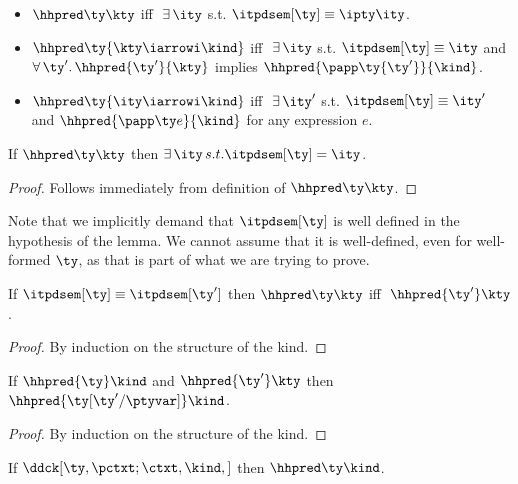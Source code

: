 \begin{definition}
\label{def:pd-props}
\begin{itemize}
\item $\hhpred \ty \kty$ iff $\ \exists\,\ity$ s.t. $\itpdsem[\ty] \equiv
  {\ipty \ity}$.
\item $\hhpred \ty {\kty \iarrowi \kind}$ iff $\ \exists\,\ity$
  s.t. $\itpdsem[\ty] \equiv \ity$ and $\forall\,\ty'.\,\hhpred
  {\ty'}{\kty}$ implies $\hhpred {\papp \ty {\ty'}}{\kind}$.
\item $\hhpred \ty {\ity \iarrowi \kind}$ iff $\ \exists\,\ity'$
  s.t. $\itpdsem[\ty] \equiv \ity'$ and $\hhpred{\papp \ty e}{\kind}$
  for any expression $e$.
\end{itemize}
\end{definition}

\begin{lemma}
  If $\hhpred \ty \kty$ then $\exists \, \ity \, s.t. \itpdsem[\ty] =
  \ity$.
\label{lemma:H-prop}
\end{lemma}
\begin{proof}
  Follows immediately from definition of $\hhpred \ty \kty$.
\end{proof}

Note that we implicitly demand that $\itpdsem[\ty]$ is well defined in
the hypothesis of the lemma. We cannot assume that it is well-defined,
even for well-formed $\ty$, as that is part of what we are trying to
prove.

\begin{lemma}
  If $\itpdsem[\ty] \equiv \itpdsem[\ty']$ then $\hhpred \ty \kty$ iff $\;\hhpred {\ty'} \kty$.
\label{lemma:eq-preserve-H}
\end{lemma}
\begin{proof}
  By induction on the structure of the kind.
\end{proof}

\begin{lemma}
  If $\hhpred {\ty} \kind$ and $\hhpred {\ty'} \kty$ then $\hhpred {\ty[\ty'/\ptyvar]} \kind$.
\label{lemma:hh-subst}
\label{lemma:sub-preserve-H}
\end{lemma}
\begin{proof}
  By induction on the structure of the kind. 
\end{proof}

\begin{lemma}
\label{lemma:pd-log-rel}
If $\ddck[\ty,{\pctxt;\ctxt},\kind,{}]$ then $\hhpred \ty \kind$.
\end{lemma}

